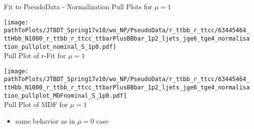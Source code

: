 \begin{frame}{Fit to PseudoData - Normalization Pull Plots for $\mu = 1$}

\begin{minipage}{0.44\textwidth}
\centering
\texttt{[image: \\pathToPlots/JTBDT\_Spring17v10/wo\_NP/PseudoData/r\_ttbb\_r\_ttcc/63445464\_ttHbb\_N1000\_r\_ttbb\_r\_ttcc\_ttbarPlusBBbar\_1p2\_ljets\_jge6\_tge4\_normalisation\_pullplot\_nominal\_S\_1p0.pdf]}\\
Pull Plot of r-Fit for $\mu = 1$

\end{minipage}
\hfill
\begin{minipage}{0.44\textwidth}
\centering
\texttt{[image: \\pathToPlots/JTBDT\_Spring17v10/wo\_NP/PseudoData/r\_ttbb\_r\_ttcc/63445464\_ttHbb\_N1000\_r\_ttbb\_r\_ttcc\_ttbarPlusBBbar\_1p2\_ljets\_jge6\_tge4\_normalisation\_pullplot\_MDFnominal\_S\_1p0.pdf]}\\
Pull Plot of MDF for $\mu = 1$

\end{minipage}
\begin{itemize}
\item same behavior as in $\mu = 0$ case
\end{itemize}
\end{frame}
